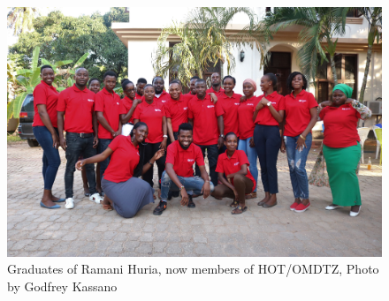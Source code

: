 \documentclass[a4paper,12pt,twoside]{article}
\begin{document}
\begin{figure}[h]
    \centering
    \includegraphics[width=.95\textwidth]{images/Teamshot.JPG}
    \caption{Graduates of Ramani Huria, now members of HOT/OMDTZ, Photo by Godfrey Kassano}
    \label{fig:my_label}
\end{figure}
\end{document}
